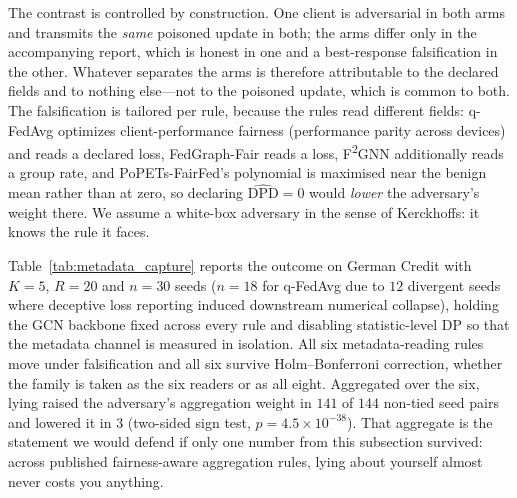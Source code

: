\documentclass[preprint,12pt]{elsarticle}
\theoremstyle{plain}
\theoremstyle{definition}
\theoremstyle{remark}
\newcommand{\dpd}{\mathrm{DPD}}
\begin{document}
The contrast is controlled by construction. One client is adversarial in both arms and transmits the \emph{same} poisoned update in both; the arms differ only in the accompanying report, which is honest in one and a best-response falsification in the other. Whatever separates the arms is therefore attributable to the declared fields and to nothing else---not to the poisoned update, which is common to both. The falsification is tailored per rule, because the rules read different fields: q-FedAvg \cite{li2020fair} optimizes client-performance fairness (performance parity across devices) and reads a declared loss, FedGraph-Fair reads a loss, F\textsuperscript{2}GNN additionally reads a group rate, and PoPETs-FairFed's polynomial is maximised near the benign mean rather than at zero, so declaring $\widehat{\dpd} = 0$ would \emph{lower} the adversary's weight there. We assume a white-box adversary in the sense of Kerckhoffs: it knows the rule it faces.

Table~\ref{tab:metadata_capture} reports the outcome on German Credit with $K = 5$, $R = 20$ and $n = 30$ seeds ($n=18$ for q-FedAvg due to $12$ divergent seeds where deceptive loss reporting induced downstream numerical collapse), holding the GCN backbone fixed across every rule and disabling statistic-level DP so that the metadata channel is measured in isolation. All six metadata-reading rules move under falsification and all six survive Holm--Bonferroni correction, whether the family is taken as the six readers or as all eight. Aggregated over the six, lying raised the adversary's aggregation weight in $141$ of $144$ non-tied seed pairs and lowered it in $3$ (two-sided sign test, $p = 4.5 \times 10^{-38}$). That aggregate is the statement we would defend if only one number from this subsection survived: across published fairness-aware aggregation rules, lying about yourself almost never costs you anything.
\end{document}
